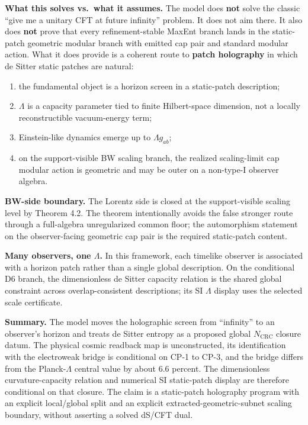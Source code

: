 \textbf{What this solves vs.\ what it assumes.} The model does \textbf{not} solve the classic ``give me a unitary CFT at future infinity'' problem. It does not aim there. It also does \textbf{not} prove that every refinement-stable MaxEnt branch lands in the static-patch geometric modular branch with emitted cap pair and standard modular action. What it does provide is a coherent route to \textbf{patch holography} in which de Sitter static patches are natural:
\begin{enumerate}
\def\labelenumi{\arabic{enumi}.}
\item
the fundamental object is a horizon screen in a static-patch description;
\item
\(\Lambda\) is a capacity parameter tied to finite Hilbert-space dimension, not a locally reconstructible vacuum-energy term;
\item
Einstein-like dynamics emerge up to \(\Lambda g_{ab}\);
\item
on the support-visible BW scaling branch, the realized scaling-limit cap modular action is geometric and may be outer on a non-type-I observer algebra.
\end{enumerate}

\textbf{BW-side boundary.} The Lorentz side is closed at the support-visible scaling level by Theorem 4.2. The theorem intentionally avoids the false stronger route through a full-algebra unregularized common floor; the automorphism statement on the observer-facing geometric cap pair is the required static-patch content.

\textbf{Many observers, one \(\Lambda\).} In this framework, each timelike observer is associated with a horizon patch rather than a single global description. On the conditional D6 branch, the dimensionless de Sitter capacity relation is the shared global constraint across overlap-consistent descriptions; its SI \(\Lambda\) display uses the selected scale certificate.

\textbf{Summary.} The model moves the holographic screen from ``infinity'' to an observer's horizon and treats de Sitter entropy as a proposed global \(N_{\mathrm{CRC}}\) closure datum. The physical cosmic readback map is unconstructed, its identification with the electroweak bridge is conditional on CP-1 to CP-3, and the bridge differs from the Planck-\(\Lambda\) central value by about \(6.6\) percent. The dimensionless curvature-capacity relation and numerical SI static-patch display are therefore conditional on that closure. The claim is a static-patch holography program with an explicit local/global split and an explicit extracted-geometric-subnet scaling boundary, without asserting a solved dS/CFT dual.

